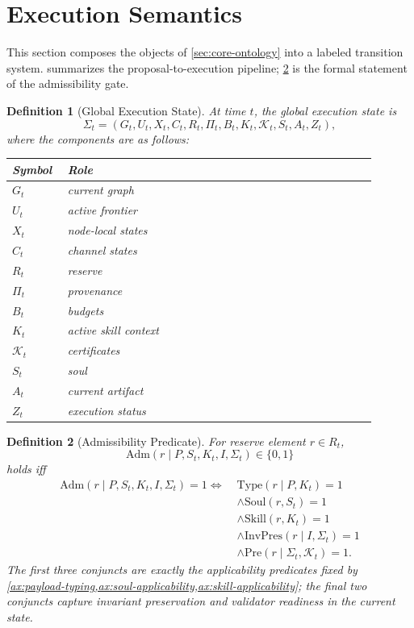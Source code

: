 \documentclass[11pt]{article}
\newtheorem{definition}{Definition}[section]
\theoremstyle{remark}
\newcommand{\Adm}{\mathrm{Adm}}
\newcommand{\Type}{\mathrm{Type}}
\newcommand{\Skill}{\mathrm{Skill}}
\newcommand{\Soul}{\mathrm{Soul}}
\begin{document}
\section{Execution Semantics}\label{sec:execution-semantics}

This section composes the objects of \cref{sec:core-ontology} into a labeled transition system.  summarizes the proposal-to-execution pipeline; \cref{def:admissibility} is the formal statement of the admissibility gate.

\begin{definition}[Global Execution State]
At time \(t\), the global execution state is
\[
\Sigma_t=(G_t,U_t,X_t,C_t,R_t,\Pi_t,B_t,K_t,\mathcal{K}_t,S_t,A_t,Z_t),
\]
where the components are as follows:
\begin{center}
\small
\begin{tabular}{@{}p{0.14\linewidth}p{0.78\linewidth}@{}}
\toprule
\textbf{Symbol} & \textbf{Role} \\
\midrule
\(G_t\) & current graph \\
\(U_t\) & active frontier \\
\(X_t\) & node-local states \\
\(C_t\) & channel states \\
\(R_t\) & reserve \\
\(\Pi_t\) & provenance \\
\(B_t\) & budgets \\
\(K_t\) & active skill context \\
\(\mathcal{K}_t\) & certificates \\
\(S_t\) & soul \\
\(A_t\) & current artifact \\
\(Z_t\) & execution status \\
\bottomrule
\end{tabular}
\end{center}
\end{definition}

\begin{definition}[Admissibility Predicate]\label{def:admissibility}
For reserve element \(r\in R_t\),
\[
\Adm(r \mid P,S_t,K_t,I,\Sigma_t)\in\{0,1\}
\]
holds iff
\[
\begin{aligned}
\Adm(r \mid P,S_t,K_t,I,\Sigma_t)=1
\iff{}\;& \Type(r \mid P,K_t)=1 \\
&\land \Soul(r,S_t)=1 \\
&\land \Skill(r,K_t)=1 \\
&\land \mathrm{InvPres}(r \mid I,\Sigma_t)=1 \\
&\land \mathrm{Pre}(r \mid \Sigma_t,\mathcal{K}_t)=1.
\end{aligned}
\]
The first three conjuncts are exactly the applicability predicates fixed by \cref{ax:payload-typing,ax:soul-applicability,ax:skill-applicability}; the final two conjuncts capture invariant preservation and validator readiness in the current state.
\end{definition}
\end{document}
